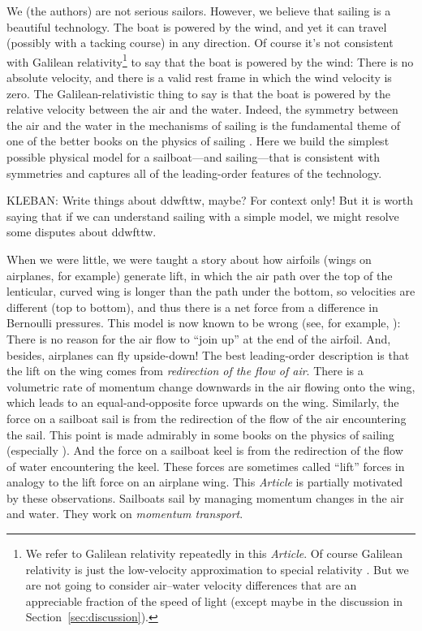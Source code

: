 \documentclass[letterpaper]{article}
\newcommand{\documentname}{\textsl{Article}}
\newcommand{\secref}[1]{Section~\ref{#1}}
\begin{document}
We (the authors) are not serious sailors.
However, we believe that sailing is a beautiful technology.
The boat is powered by the wind, and yet it can travel (possibly with a tacking course) in any direction.
Of course it's not consistent with Galilean relativity\footnote{We refer to Galilean relativity repeatedly in this \documentname.
Of course Galilean relativity is just the low-velocity approximation to special relativity \cite{sr}.
But we are not going to consider air--water velocity differences that are an appreciable fraction of the speed of light (except maybe in the discussion in \secref{sec:discussion}).} to say that the boat is powered by the wind:
There is no absolute velocity, and there is a valid rest frame in which the wind velocity is zero.
The Galilean-relativistic thing to say is that the boat is powered by the relative velocity between the air and the water.
Indeed, the symmetry between the air and the water in the mechanisms of sailing is the fundamental theme of one of the better books on the physics of sailing \cite{symmetry}.
Here we build the simplest possible physical model for a sailboat---and sailing---that is consistent with symmetries and captures all of the leading-order features of the technology.

KLEBAN: Write things about ddwfttw, maybe? For context only! But it is worth saying that if we can understand sailing with a simple model, we might resolve some disputes about ddwfttw.

When we were little, we were taught a story about how airfoils (wings on airplanes, for example) generate lift, in which the air path over the top of the lenticular, curved wing is longer than the path under the bottom, so velocities are different (top to bottom), and thus there is a net force from a difference in Bernoulli pressures.
This model is now known to be wrong (see, for example, \cite{lift}):
There is no reason for the air flow to ``join up'' at the end of the airfoil.
And, besides, airplanes can fly upside-down!
The best leading-order description is that the lift on the wing comes from \emph{redirection of the flow of air}.
There is a volumetric rate of momentum change downwards in the air flowing onto the wing, which leads to an equal-and-opposite force upwards on the wing.
Similarly, the force on a sailboat sail is from the redirection of the flow of the air encountering the sail.
This point is made admirably in some books on the physics of sailing (especially \cite{sails}).
And the force on a sailboat keel is from the redirection of the flow of water encountering the keel.
These forces are sometimes called ``lift'' forces in analogy to the lift force on an airplane wing.
This \documentname{} is partially motivated by these observations.
Sailboats sail by managing momentum changes in the air and water.
They work on \emph{momentum transport}.
\end{document}
